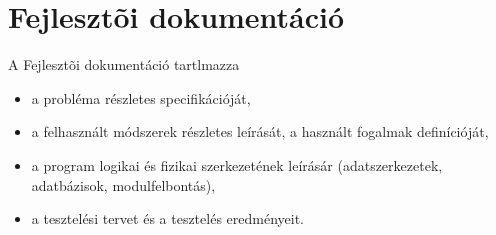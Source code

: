 
\chapter{Fejlesztõi dokumentáció}

A Fejlesztõi dokumentáció tartlmazza
\begin{itemize}
\item a probléma részletes specifikációját,
\item a felhasznált módszerek részletes leírását, a használt fogalmak definícióját,
\item a program logikai és fizikai szerkezetének leírásár (adatszerkezetek, adatbázisok, modulfelbontás),
\item a tesztelési tervet és a tesztelés eredményeit.
\end{itemize}
